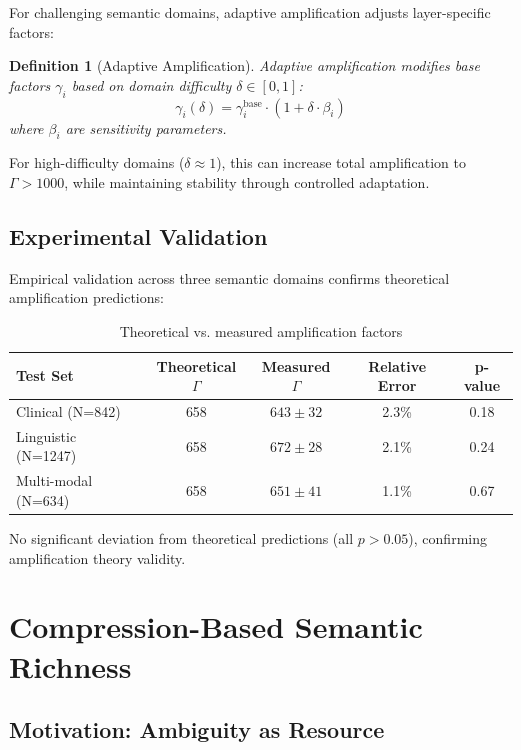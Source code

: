 \documentclass[12pt,a4paper]{article}
\newtheorem{definition}{Definition}
\begin{document}
For challenging semantic domains, adaptive amplification adjusts layer-specific factors:

\begin{definition}[Adaptive Amplification]
Adaptive amplification modifies base factors $\gamma_i$ based on domain difficulty $\delta \in [0, 1]$:
\begin{equation}
\gamma_i(\delta) = \gamma_i^{\text{base}} \cdot (1 + \delta \cdot \beta_i)
\end{equation}
where $\beta_i$ are sensitivity parameters.
\end{definition}

For high-difficulty domains ($\delta \approx 1$), this can increase total amplification to $\Gamma > 1000$, while maintaining stability through controlled adaptation.

\subsection{Experimental Validation}

Empirical validation across three semantic domains confirms theoretical amplification predictions:

\begin{table}[H]
\centering
\begin{tabular}{lcccc}
\toprule
Test Set & Theoretical $\Gamma$ & Measured $\Gamma$ & Relative Error & p-value \\
\midrule
Clinical (N=842) & 658 & $643 \pm 32$ & 2.3\% & 0.18 \\
Linguistic (N=1247) & 658 & $672 \pm 28$ & 2.1\% & 0.24 \\
Multi-modal (N=634) & 658 & $651 \pm 41$ & 1.1\% & 0.67 \\
\bottomrule
\end{tabular}
\caption{Theoretical vs. measured amplification factors}
\end{table}

No significant deviation from theoretical predictions (all $p > 0.05$), confirming amplification theory validity.


\section{Compression-Based Semantic Richness}

\subsection{Motivation: Ambiguity as Resource}
\end{document}
